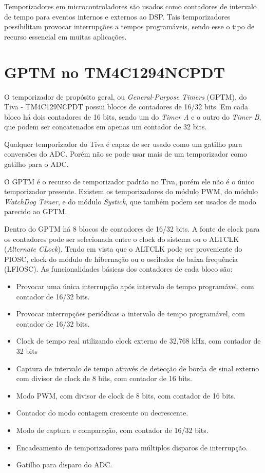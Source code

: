
Temporizadores em microcontroladores são usados como contadores de intervalo de tempo para eventos internos e externos ao DSP. Tais temporizadores possibilitam provocar interrupções a tempos programáveis, sendo esse o tipo de recurso essencial em muitas aplicações.  

\section{GPTM no TM4C1294NCPDT}

O temporizador de propósito geral, ou \emph{General-Purpose Timers} (GPTM),  do Tiva - TM4C129NCPDT possui blocos de contadores de 16/32 bits. Em cada bloco há dois contadores de 16 bits, sendo um do \emph{Timer A} e o outro do \emph{Timer B}, que podem ser concatenados em apenas um contador de 32 bits.

Qualquer temporizador do Tiva é capaz de ser usado como um gatilho para conversões do ADC. Porém não se pode usar mais de um temporizador como gatilho para o ADC.

O GPTM é o recurso de temporizador padrão no Tiva, porém ele não é o único temporizador presente. Existem os temporizadores do módulo PWM, do módulo \emph{WatchDog Timer}, e do módulo \emph{Systick}, que também podem ser usados de modo parecido ao GPTM. 

Dentro do GPTM há 8 blocos de contadores de 16/32 bits. A fonte de clock para os contadores pode ser selecionada entre o clock do sistema ou o ALTCLK (\emph{Alternate CLock}). Tendo em vista que o ALTCLK pode ser proveniente do PIOSC, clock do módulo de hibernação ou o oscilador de baixa frequência (LFIOSC).  As funcionalidades básicas dos contadores de cada bloco são: 

\begin{itemize}
	\item Provocar uma única interrupção após intervalo de tempo programável, com contador de 16/32 bits.
	\item Provocar interrupções periódicas a intervalo de tempo programável, com contador de 16/32 bits.
	\item Clock de tempo real utilizando clock externo de 32,768 kHz, com contador de 32 bits
	\item Captura de intervalo de tempo através de detecção de borda de sinal externo com divisor de clock de 8 bits, com contador de 16 bits. 
	\item Modo PWM, com divisor de clock de 8 bits, com contador de 16 bits.
	\item Contador do modo contagem crescente ou decrescente.
	\item Modo de captura e comparação, com contador de 16/32 bits.
	\item Encadeamento de temporizadores para múltiplos disparos de interrupção.
	\item Gatilho para disparo do ADC.
\end{itemize}

